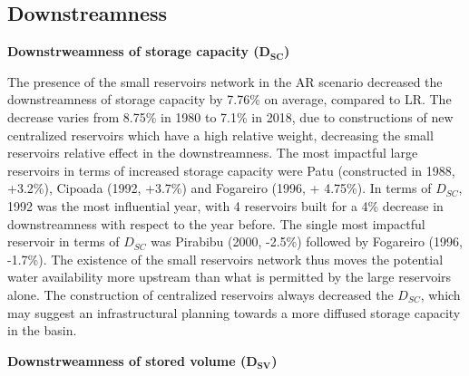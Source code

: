 \documentclass[draft]{agujournal2019}
\begin{document}
\subsection{Downstreamness}

\textbf{Downstrweamness of storage capacity ($\bm{D_{SC}}$)}

The presence of the small reservoirs network in the AR scenario decreased the downstreamness of storage capacity by 7.76\% on average, compared to LR. The decrease varies from 8.75\% in 1980 to 7.1\% in 2018, due to constructions of new centralized reservoirs which have a high relative weight, decreasing the small reservoirs relative effect in the downstreamness. The most impactful large reservoirs in terms of increased storage capacity were Patu (constructed in 1988, +3.2\%),  Cipoada (1992, +3.7\%) and Fogareiro (1996, + 4.75\%). In terms of $D_{SC}$, 1992 was the most influential year, with 4 reservoirs built for a 4\% decrease in downstreamness with respect to the year before. The single most impactful reservoir in terms of $D_{SC}$ was Pirabibu (2000, -2.5\%) followed by Fogareiro (1996, -1.7\%). The existence of the small reservoirs network thus moves the potential water availability more upstream than what is permitted by the large reservoirs alone. The construction of centralized reservoirs always decreased the $D_{SC}$, which may suggest an infrastructural planning towards a more diffused storage capacity in the basin.

\textbf{Downstrweamness of stored volume ($\bm{D_{SV}}$)}
\end{document}
